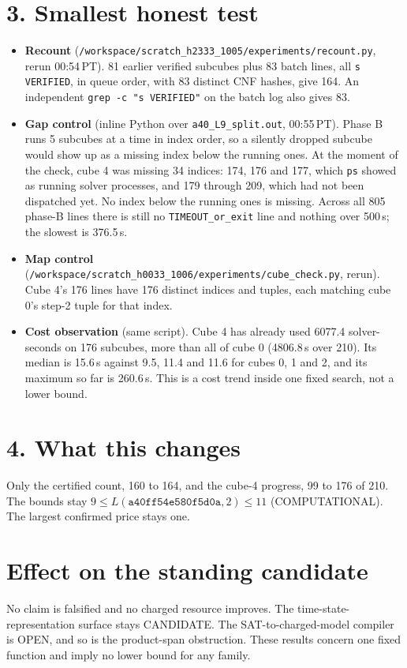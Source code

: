 \documentclass[11pt]{article}
\begin{document}
\section*{3. Smallest honest test}
\begin{itemize}
\item \textbf{Recount} (\texttt{/workspace/scratch\_h2333\_1005/experiments/recount.py}, rerun 00:54\,PT). 81 earlier verified subcubes plus 83 batch lines, all \texttt{s VERIFIED}, in queue order, with 83 distinct CNF hashes, give 164. An independent \texttt{grep -c "s VERIFIED"} on the batch log also gives 83.
\item \textbf{Gap control} (inline Python over \texttt{a40\_L9\_split.out}, 00:55\,PT). Phase B runs 5 subcubes at a time in index order, so a silently dropped subcube would show up as a missing index below the running ones. At the moment of the check, cube 4 was missing 34 indices: 174, 176 and 177, which \texttt{ps} showed as running solver processes, and 179 through 209, which had not been dispatched yet. No index below the running ones is missing. Across all 805 phase-B lines there is still no \texttt{TIMEOUT\_or\_exit} line and nothing over 500\,s; the slowest is 376.5\,s.
\item \textbf{Map control} (\texttt{/workspace/scratch\_h0033\_1006/experiments/cube\_check.py}, rerun). Cube 4's 176 lines have 176 distinct indices and tuples, each matching cube 0's step-2 tuple for that index.
\item \textbf{Cost observation} (same script). Cube 4 has already used 6077.4 solver-seconds on 176 subcubes, more than all of cube 0 (4806.8\,s over 210). Its median is 15.6\,s against 9.5, 11.4 and 11.6 for cubes 0, 1 and 2, and its maximum so far is 260.6\,s. This is a cost trend inside one fixed search, not a lower bound.
\end{itemize}

\section*{4. What this changes}
Only the certified count, 160 to 164, and the cube-4 progress, 99 to 176 of 210. The bounds stay $9\le L(\texttt{a40ff54e580f5d0a},2)\le 11$ (COMPUTATIONAL). The largest confirmed price stays one.

\section*{Effect on the standing candidate}
No claim is falsified and no charged resource improves. The time-state-representation surface stays CANDIDATE. The SAT-to-charged-model compiler is OPEN, and so is the product-span obstruction. These results concern one fixed function and imply no lower bound for any family.
\end{document}
